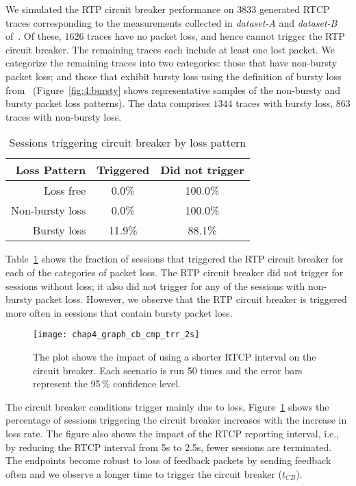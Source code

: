 We simulated the RTP circuit breaker performance on $3833$ generated RTCP traces
corresponding to the measurements collected in \emph{dataset-A} and
\emph{dataset-B} of~\cite{ellis:2011:dataset}. Of these, $1626$ traces have no
packet loss, and hence cannot trigger the RTP circuit breaker. The remaining
traces each include at least one lost packet. We categorize the remaining
traces into two categories: those that have non-bursty packet loss; and those
that exhibit bursty loss using the definition of bursty loss
from~\cite{rfc3611} (Figure~\ref{fig:4:bursty} shows representative samples of
the non-bursty and bursty packet loss patterns). The data comprises $1344$
traces with bursty loss, $863$ traces with non-bursty loss.

\begin{table}
  \begin{center}
    \begin{tabular}{rcc}
    \toprule
    Loss Pattern       & Triggered & Did not trigger \\
    \midrule
             Loss free &   0.0\% & 100.0\% \\
       Non-bursty loss &   0.0\% & 100.0\% \\
          Bursty loss  &  11.9\% &  88.1\% \\
    \bottomrule
    \end{tabular}
    \caption{Sessions triggering circuit breaker by loss pattern}
    \label{tab:4:cb_bursty}
  \end{center}
\end{table}



Table~\ref{tab:4:cb_bursty} shows the fraction of sessions that triggered the
RTP circuit breaker for each of the categories of packet loss. The RTP circuit
breaker did not trigger for sessions without loss; it also did not trigger for
any of the sessions with non-bursty packet loss. However, we observe that the
RTP circuit breaker is triggered more often in sessions that contain bursty
packet loss. 

\begin{figure}[!t]
  \centerline{
    {\texttt{[image: chap4\_graph\_cb\_cmp\_trr\_2s]}}
  }
  \caption{The plot shows the impact of using a shorter RTCP interval on the
  circuit breaker. Each scenario is run 50 times and the error bars represent
  the 95\,\% confidence level.}
  \label{fig:4:short-rtcp}
\end{figure}

The circuit breaker conditions trigger mainly due to loss, Figure~\ref{fig:4:short-rtcp} 
shows the percentage of sessions triggering the circuit breaker
increases with the increase in loss rate. The figure also shows the impact of
the RTCP reporting interval, i.e., by reducing the RTCP interval from 5s to
2.5s, fewer sessions are terminated. The endpoints become robust to loss of
feedback packets by sending feedback often and we observe a longer time to
trigger the circuit breaker ($t_{CB}$).

